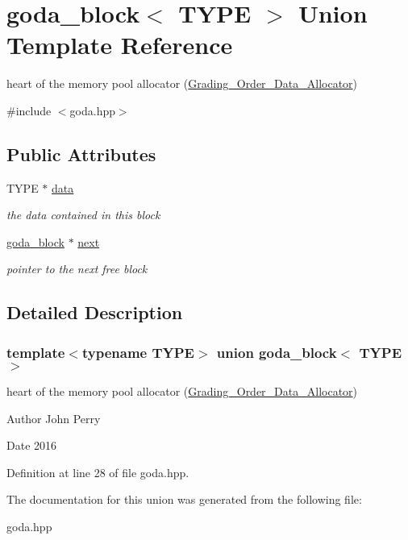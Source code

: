 \hypertarget{uniongoda__block}{}\section{goda\+\_\+block$<$ T\+Y\+PE $>$ Union Template Reference}
\label{uniongoda__block}


heart of the memory pool allocator (\hyperlink{class_grading___order___data___allocator}{Grading\+\_\+\+Order\+\_\+\+Data\+\_\+\+Allocator})  




{\ttfamily \#include $<$goda.\+hpp$>$}

\subsection*{Public Attributes}
\begin{DoxyCompactItemize}
\item 
\mbox{\label{uniongoda__block_ad5bea3a00bf688f2db31ad5db90e3deb}} 
T\+Y\+PE $\ast$ \hyperlink{uniongoda__block_ad5bea3a00bf688f2db31ad5db90e3deb}{data}
\begin{DoxyCompactList}\small\item\em the data contained in this block \end{DoxyCompactList}\item 
\mbox{\label{uniongoda__block_a1f5592b3fed7857bf9336a8e4fba4fdc}} 
\hyperlink{uniongoda__block}{goda\+\_\+block} $\ast$ \hyperlink{uniongoda__block_a1f5592b3fed7857bf9336a8e4fba4fdc}{next}
\begin{DoxyCompactList}\small\item\em pointer to the next free block \end{DoxyCompactList}\end{DoxyCompactItemize}


\subsection{Detailed Description}
\subsubsection*{template$<$typename T\+Y\+PE$>$\newline
union goda\+\_\+block$<$ T\+Y\+P\+E $>$}

heart of the memory pool allocator (\hyperlink{class_grading___order___data___allocator}{Grading\+\_\+\+Order\+\_\+\+Data\+\_\+\+Allocator}) 

\begin{DoxyAuthor}{Author}
John Perry 
\end{DoxyAuthor}
\begin{DoxyDate}{Date}
2016 
\end{DoxyDate}


Definition at line 28 of file goda.\+hpp.



The documentation for this union was generated from the following file\+:\begin{DoxyCompactItemize}
\item 
goda.\+hpp\end{DoxyCompactItemize}
